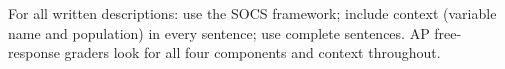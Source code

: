 \documentclass[10pt]{article}
\begin{document}
\namedateperiod

\vspace{0.1in}

\begin{tcolorbox}[colback=sky, colframe=navy, boxrule=0.8pt, arc=2mm,
    left=3mm, right=3mm, top=1.5mm, bottom=1.5mm]
\small For all written descriptions: use the SOCS framework; include context
(variable name and population) in every sentence; use complete sentences.
AP free-response graders look for all four components and context throughout.
\end{tcolorbox}

\vspace{0.14in}

\end{document}

